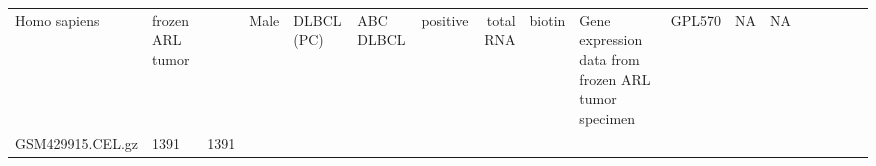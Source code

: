 \documentclass[]{article}
\begin{document}
\begin{longtable}[]{@{}lllllllrllllllllll@{}}
\begin{minipage}[t]{0.02\columnwidth}
Homo sapiens\strut
\end{minipage} & \begin{minipage}[t]{0.04\columnwidth}\raggedright
frozen ARL tumor\strut
\end{minipage} & \begin{minipage}[t]{0.05\columnwidth}\raggedleft
24\strut
\end{minipage} & \begin{minipage}[t]{0.04\columnwidth}\raggedright
Male\strut
\end{minipage} & \begin{minipage}[t]{0.06\columnwidth}\raggedright
DLBCL (PC)\strut
\end{minipage} & \begin{minipage}[t]{0.06\columnwidth}\raggedright
ABC DLBCL\strut
\end{minipage} & \begin{minipage}[t]{0.04\columnwidth}\raggedright
positive\strut
\end{minipage} & \begin{minipage}[t]{0.02\columnwidth}\raggedright
total RNA\strut
\end{minipage} & \begin{minipage}[t]{0.01\columnwidth}\raggedright
biotin\strut
\end{minipage} & \begin{minipage}[t]{0.08\columnwidth}\raggedright
Gene expression data from frozen ARL tumor specimen\strut
\end{minipage} & \begin{minipage}[t]{0.01\columnwidth}\raggedright
GPL570\strut
\end{minipage} & \begin{minipage}[t]{0.00\columnwidth}\raggedright
NA\strut
\end{minipage} & \begin{minipage}[t]{0.01\columnwidth}\raggedright
NA\strut
\end{minipage}\tabularnewline
\begin{minipage}[t]{0.03\columnwidth}\raggedright
GSM429915.CEL.gz\strut
\end{minipage} & \begin{minipage}[t]{0.02\columnwidth}\raggedright
1391\strut
\end{minipage} & \begin{minipage}[t]{0.01\columnwidth}\raggedright
1391\strut
\end{minipage} & \begin{minipage}[t]{0.02\columnwidth}\raggedright

\end{minipage}
\end{longtable}
\end{document}
